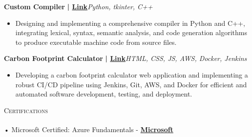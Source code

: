 \documentclass[a4paper]{article}
\newcommand{\lineunder} {
    \vspace*{-8pt} \\
    \hspace*{-18pt} \hrulefill \\
}
\newcommand{\header} [1] {
    {\hspace*{-18pt}\vspace*{6pt} \textsc{#1}}
    \vspace*{-6pt} \lineunder
}
\begin{document}
    \vspace{-2.5mm}
      {\textbf{Custom Compiler}}\textbf{ | \href{https://github.com/Kunal2703/Build-our-own-Compiler}{Link}}\hfill{\sl Python, tkinter, C++}\\
          \vspace{-3mm}
\begin{itemize} \itemsep -3pt
\item  Designing and implementing a comprehensive compiler in Python and C++, integrating lexical, syntax, semantic analysis, and code generation algorithms to produce executable machine code from source files.
\end{itemize}


    \vspace{-1.5mm}
      {\textbf{Carbon Footprint Calculator}}\textbf{ | \href{https://github.com/Kunal2703/Carbon-Footprint-Tracker}{Link}}\hfill{\sl HTML, CSS, JS, AWS, Docker, Jenkins}\\
          \vspace{-3mm}
\begin{itemize} \itemsep -3pt
\item  Developing a carbon footprint calculator web application and implementing a robust CI/CD pipeline using Jenkins, Git, AWS, and Docker for efficient and automated software development, testing, and deployment.
\end{itemize}

      \vspace{-1mm}
      \header{Certifications}
      \vspace{1mm}
      • Microsoft Certified: Azure Fundamentals - \textbf{\href{https://www.credly.com/badges/b9331203-6ef9-4fd2-911d-e0930648c95c?source=linked\_in\_profile}{Microsoft}}\\
\vspace*{1mm}
\end{document}
